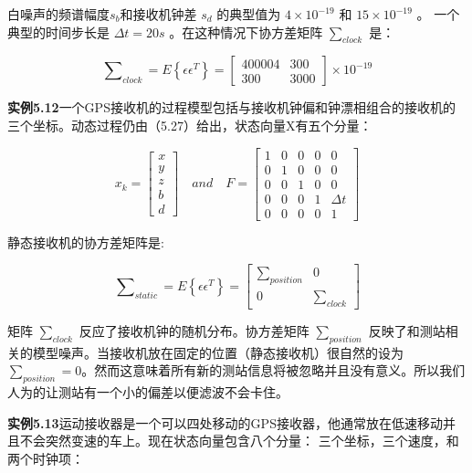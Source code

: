 		  白噪声的频谱幅度$ s_{b} $和接收机钟差 $ s_{d} $ 的典型值为  $ 4\times10^{-19} $ 和 $ 15\times10^{-19} $ 。
		  一个典型的时间步长是  $ \Delta t=20s $ 。在这种情况下协方差矩阵 $ \sum\nolimits_{clock} $ 是：
		  
		  	\[ \sum\nolimits_{clock}=E\left\lbrace \epsilon \epsilon^{T} \right\rbrace =\begin{bmatrix}
		  400004&300\\300&3000
		  \end{bmatrix}\times10^{-19} \] 
		  
		  \textbf{实例5.12}一个GPS接收机的过程模型包括与接收机钟偏和钟漂相组合的接收机的三个坐标。动态过程仍由（5.27）给出，状态向量X有五个分量：
		  
		  	\[ x_{k}=\begin{bmatrix}
		  x\\y\\z\\b\\d
		  \end{bmatrix}\quad and \quad  F=\begin{bmatrix}
		  1&0&0&0&0\\0&1&0&0&0\\0&0&1&0&0\\0&0&0&1&\Delta t\\0&0&0&0&1
		  \end{bmatrix}  \]
		  
		  静态接收机的协方差矩阵是:
		  
		 	\begin{equation}\label{5.29}
		 \sum\nolimits_{static} = E\left\lbrace \epsilon \epsilon^{T} \right\rbrace = \begin{bmatrix}
		 \sum\nolimits_{position}&0\\0&\sum\nolimits_{clock}
		 \end{bmatrix}
		 \end{equation}
		  
		  
		  矩阵 $ \sum\nolimits_{clock} $ 反应了接收机钟的随机分布。协方差矩阵 $ \sum\nolimits_{position} $ 反映了和测站相关的模型噪声。当接收机放在固定的位置（静态接收机）很自然的设为 $ \sum\nolimits_{position}=0$。然而这意味着所有新的测站信息将被忽略并且没有意义。所以我们人为的让测站有一个小的偏差以便滤波不会卡住。
		  
		  \textbf{实例5.13}运动接收器是一个可以四处移动的GPS接收器，他通常放在低速移动并且不会突然变速的车上。现在状态向量包含八个分量：
		  三个坐标，三个速度，和两个时钟项：
		  
